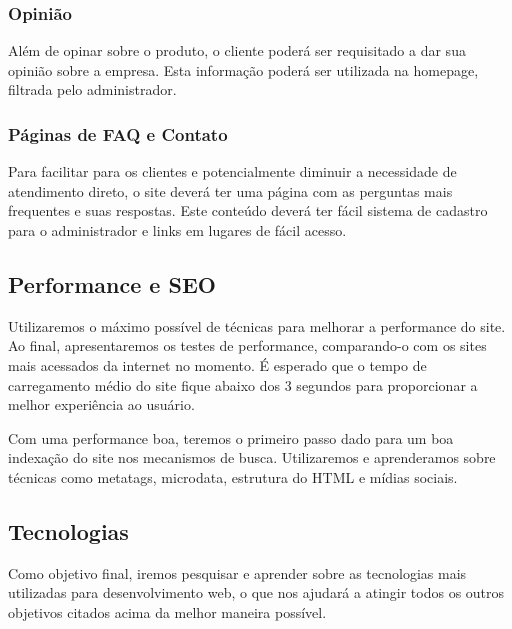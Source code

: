 \subsubsection{Opinião}
Além de opinar sobre o produto, o cliente poderá ser requisitado a dar sua opinião sobre a empresa. Esta informação poderá ser utilizada na homepage, filtrada pelo administrador.

\subsubsection{Páginas de FAQ e Contato}
Para facilitar para os clientes e potencialmente diminuir a necessidade de atendimento direto, o site deverá ter uma página com as perguntas mais frequentes e suas respostas. Este conteúdo deverá ter fácil sistema de cadastro para o administrador e links em lugares de fácil acesso.

\subsection{Performance e SEO}

Utilizaremos o máximo possível de técnicas para melhorar a performance do site. Ao final, apresentaremos os testes de performance, comparando-o com os sites mais acessados da internet no momento. É esperado que o tempo de carregamento médio do site fique abaixo dos 3 segundos para proporcionar a melhor experiência ao usuário.

Com uma performance boa, teremos o primeiro passo dado para um boa indexação do site nos mecanismos de busca. Utilizaremos e aprenderamos sobre técnicas como metatags, microdata, estrutura do HTML e mídias sociais.

\subsection{Tecnologias}

Como objetivo final, iremos pesquisar e aprender sobre as tecnologias mais utilizadas para desenvolvimento web, o que nos ajudará a atingir todos os outros objetivos citados acima da melhor maneira possível.
